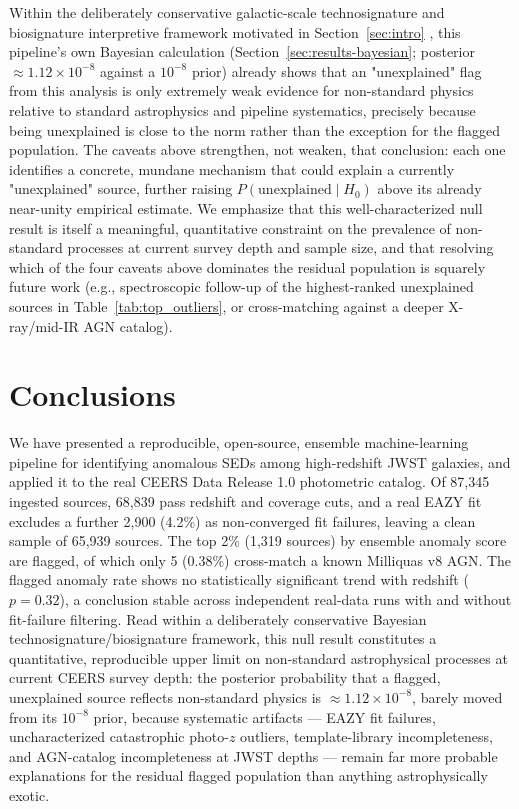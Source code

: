 \documentclass[twocolumn]{aastex631}
\begin{document}
Within the deliberately conservative galactic-scale technosignature and
biosignature interpretive framework motivated in Section~\ref{sec:intro}
\citep{Wright2014, LingamLoeb2019, Lacki2016}, this pipeline's own Bayesian
calculation (Section~\ref{sec:results-bayesian}; posterior
$\approx1.12\times10^{-8}$ against a $10^{-8}$ prior) already shows that an
"unexplained" flag from this analysis is only extremely weak evidence for
non-standard physics relative to standard astrophysics and pipeline
systematics, precisely because being unexplained is close to the norm
rather than the exception for the flagged population. The caveats above
strengthen, not weaken, that conclusion: each one identifies a concrete,
mundane mechanism that could explain a currently "unexplained" source,
further raising $P(\mathrm{unexplained}\mid H_0)$ above its already
near-unity empirical estimate. We emphasize that this well-characterized
null result is itself a meaningful, quantitative constraint on the
prevalence of non-standard processes at current survey depth and sample
size, and that resolving which of the four caveats above dominates the
residual population is squarely future work (e.g., spectroscopic follow-up
of the highest-ranked unexplained sources in Table~\ref{tab:top_outliers},
or cross-matching against a deeper X-ray/mid-IR AGN catalog).

\section{Conclusions}
\label{sec:conclusions}

We have presented a reproducible, open-source, ensemble machine-learning
pipeline for identifying anomalous SEDs among high-redshift JWST galaxies,
and applied it to the real CEERS Data Release 1.0 photometric catalog. Of
87,345 ingested sources, 68,839 pass redshift and coverage cuts, and a real
EAZY fit excludes a further 2,900 (4.2\%) as non-converged fit failures,
leaving a clean sample of 65,939 sources. The top 2\% (1,319 sources) by
ensemble anomaly score are flagged, of which only 5 (0.38\%) cross-match a
known Milliquas v8 AGN. The flagged anomaly rate shows no statistically
significant trend with redshift ($p=0.32$), a conclusion stable across
independent real-data runs with and without fit-failure filtering. Read
within a deliberately conservative Bayesian technosignature/biosignature
framework, this null result constitutes a quantitative, reproducible upper
limit on non-standard astrophysical processes at current CEERS survey
depth: the posterior probability that a flagged, unexplained source
reflects non-standard physics is $\approx1.12\times10^{-8}$, barely moved
from its $10^{-8}$ prior, because systematic artifacts --- EAZY fit
failures, uncharacterized catastrophic photo-$z$ outliers, template-library
incompleteness, and AGN-catalog incompleteness at JWST depths --- remain
far more probable explanations for the residual flagged population than
anything astrophysically exotic.
\end{document}
